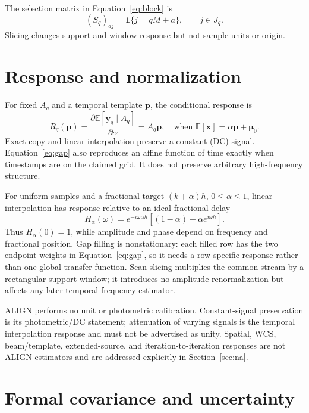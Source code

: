 \documentclass[11pt]{article}
\newcommand{\E}{\mathbb{E}}
\begin{document}
The selection matrix in Equation~\eqref{eq:block} is
\begin{equation}
 (S_q)_{a j}=\mathbf 1\{j=qM+a\},\qquad j\in J_q.
 \label{eq:selection}
\end{equation}
Slicing changes support and window response but not sample units or origin.

\section{Response and normalization}

For fixed \(A_q\) and a temporal template \(\boldsymbol p\), the conditional
response is
\begin{equation}
 R_q(\boldsymbol p)=\frac{\partial\E[\boldsymbol y_q\mid A_q]}
 {\partial\alpha}=A_q\boldsymbol p,
 \quad\text{when }\E[\boldsymbol x]=\alpha\boldsymbol p+\boldsymbol\mu_0.
 \label{eq:response}
\end{equation}
Exact copy and linear interpolation preserve a constant (DC) signal.
Equation~\eqref{eq:gap} also reproduces an affine function of time exactly
when timestamps are on the claimed grid.  It does not preserve arbitrary
high-frequency structure.

For uniform samples and a fractional target \((k+\alpha)h\), \(0\leq\alpha\leq1\),
linear interpolation has response relative to an ideal fractional delay
\begin{equation}
 H_{\alpha}(\omega)=e^{-i\omega\alpha h}
 \left[(1-\alpha)+\alpha e^{i\omega h}\right].
 \label{eq:fractional-response}
\end{equation}
Thus \(H_{\alpha}(0)=1\), while amplitude and phase depend on frequency and
fractional position.  Gap filling is nonstationary: each filled row has the
two endpoint weights in Equation~\eqref{eq:gap}, so it needs a row-specific
response rather than one global transfer function.  Scan slicing multiplies
the common stream by a rectangular support window; it introduces no amplitude
renormalization but affects any later temporal-frequency estimator.

ALIGN performs no unit or photometric calibration.  Constant-signal
preservation is its photometric/DC statement; attenuation of varying signals
is the temporal interpolation response and must not be advertised as unity.
Spatial, WCS, beam/template, extended-source, and iteration-to-iteration
responses are not ALIGN estimators and are addressed explicitly in
Section~\ref{sec:na}.

\section{Formal covariance and uncertainty}
\end{document}
